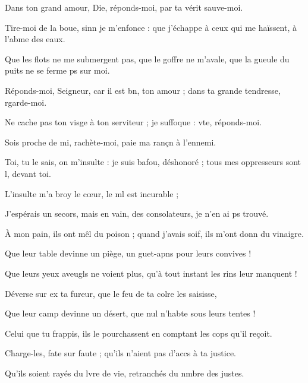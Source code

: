\item Dans ton grand amour, Die, réponds-moi,\psstar{} par ta vérit sauve-moi.
\item Tire-moi de la boue, sinn je m’enfonce :\psstar{} que j’échappe à ceux qui me haïssent, à l’abme des eaux.
\item Que les flots ne me submergent pas, que le goffre ne m’avale,\psstar{} que la gueule du puits ne se ferme ps sur moi.
\item Réponds-moi, Seigneur, car il est bn, ton amour ;\psstar{} dans ta grande tendresse, rgarde-moi.
\item Ne cache pas ton visge à ton serviteur ;\psstar{} je suffoque : vte, réponds-moi. 
\item Sois proche de mi, rachète-moi,\psstar{} paie ma rançn à l’ennemi.
\item Toi, tu le sais, on m’insulte : je suis bafou, déshonoré ;\psstar{} tous mes oppresseurs sont l, devant toi.
\item L’insulte m’a broy le cœur,\psstar{} le ml est incurable ;
\item J’espérais un secors, mais en vain,\psstar{} des consolateurs, je n’en ai ps trouvé.
\item À mon pain, ils ont mêl du poison ;\psstar{} quand j’avais soif, ils m’ont donn du vinaigre.
\item Que leur table devinne un piège,\psstar{} un guet-apns pour leurs convives !
\item Que leurs yeux aveugls ne voient plus,\psstar{} qu’à tout instant les rins leur manquent !
\item Déverse sur ex ta fureur,\psstar{} que le feu de ta colre les saisisse,
\item Que leur camp devinne un désert,\psstar{} que nul n’habte sous leurs tentes !
\item Celui que tu frappis, ils le pourchassent\psstar{} en comptant les cops qu’il reçoit.
\item Charge-les, fate sur faute ;\psstar{} qu’ils n’aient pas d’accs à ta justice.
\item Qu’ils soient rayés du lvre de vie,\psstar{} retranchés du nmbre des justes.